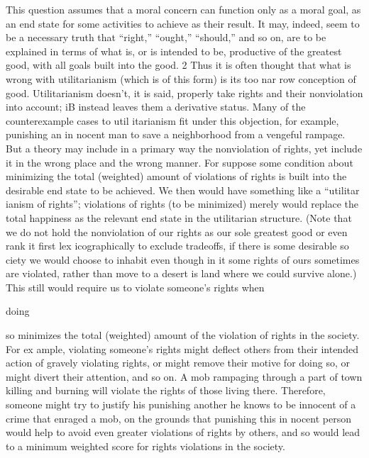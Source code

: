 \documentclass[11pt,openany]{book}
\begin{document}
This question assumes that a moral concern can function only as a moral goal, as an end state for some activities to achieve as their result. It may, indeed, seem to be a necessary truth that ``right,'' ``ought,'' ``should,'' and so on, are to be explained in terms of what is, or is intended to be, productive of the greatest good, with all goals built into the good. 2 Thus it is often thought that what is wrong with utilitarianism (which is of this form) is its too nar row conception of good. Utilitarianism doesn't, it is said, properly take rights and their nonviolation into account; iB instead leaves them a derivative status. Many of the counterexample cases to util itarianism fit under this objection, for example, punishing an in nocent man to save a neighborhood from a vengeful rampage. But a theory may include in a primary way the nonviolation of rights, yet include it in the wrong place and the wrong manner. For suppose some condition about minimizing the total (weighted) amount of violations of rights is built into the desirable end state to be achieved. We then would have something like a ``utilitar ianism of rights''; violations of rights (to be minimized) merely would replace the total happiness as the relevant end state in the utilitarian structure. (Note that we do not hold the nonviolation of our rights as our sole greatest good or even rank it first lex icographically to exclude tradeoffs, if there is some desirable so ciety we would choose to inhabit even though in it some rights of ours sometimes are violated, rather than move to a desert is land where we could survive alone.) This still would require us to violate someone's rights when 

doing 

so minimizes the total (weighted) amount of the violation of rights in the society. For ex ample, violating someone's rights might deflect others from their intended action of gravely violating rights, or might remove their motive for doing so, or might divert their attention, and so on. A mob rampaging through a part of town killing and burning will violate the rights of those living there. Therefore, someone might try to justify his punishing another he knows to be innocent of a crime that enraged a mob, on the grounds that punishing this in nocent person would help to avoid even greater violations of rights by others, and so would lead to a minimum weighted score for rights violations in the society. 
\end{document}
